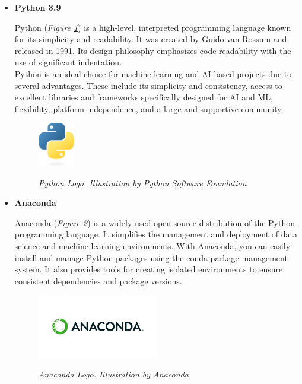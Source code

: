 \begin{itemize}
\item \textbf{Python 3.9}

Python (\textit{Figure \ref{fig:python-logo}}) is a high-level, interpreted programming language known for its simplicity and readability. It was created by Guido van Rossum and released in 1991. Its design philosophy emphasizes code readability with the use of significant indentation. \\

Python is an ideal choice for machine learning and AI-based projects due to several advantages. These include its simplicity and consistency, access to excellent libraries and frameworks specifically designed for AI and ML, flexibility, platform independence, and a large and supportive community.

\newpage

\begin{figure}[H]
\centering
\includegraphics[width=0.15\textwidth]{imatges/studies_and_decisions/python-logo-only.png}
\caption[Python Logo]{\textit{Python Logo. Illustration by Python Software Foundation}}
{\label{fig:python-logo}}
\end{figure}

\item \textbf{Anaconda}

Anaconda (\textit{Figure \ref{fig:anaconda-logo}}) is a widely used open-source distribution of the Python programming language. It simplifies the management and deployment of data science and machine learning environments. With Anaconda, you can easily install and manage Python packages using the conda package management system. It also provides tools for creating isolated environments to ensure consistent dependencies and package versions.

\begin{figure}[H]
\centering
  \begin{adjustbox}{trim=0cm 1cm 0cm 1cm, clip}
\includegraphics[width=0.5\textwidth]{imatges/studies_and_decisions/anaconda-logo.png}
\end{adjustbox}
\caption[Anaconda Logo]{\textit{Anaconda Logo. Illustration by Anaconda}}
{\label{fig:anaconda-logo}}
\end{figure}


\end{itemize}
